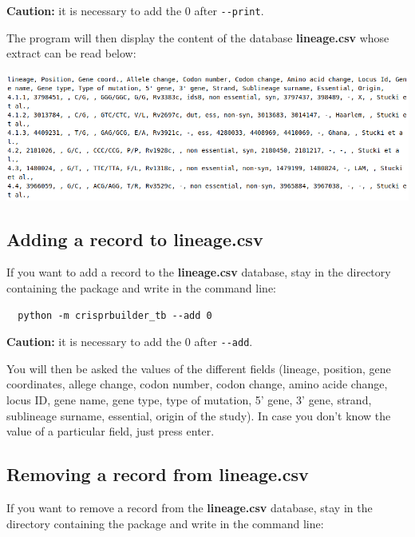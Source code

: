 \documentclass[twoside,a4paper,11pt,frenchb,openany]{report}
\begin{document}
    \textbf{Caution:} it is necessary to add the 0 after \texttt{-\/-print}.

The program will then display the content of the database
\textbf{lineage.csv} whose extract can be read below:

\includegraphics[width=16cm]{img_01.png}



    \subsection*{Adding a record to
lineage.csv}\label{adding-a-record-to-lineage.csv}

    If you want to add a record to the \textbf{lineage.csv} database, stay
in the directory containing the package and write in the command line:

    \begin{verbatim}
  python -m crisprbuilder_tb --add 0
\end{verbatim}

    \textbf{Caution:} it is necessary to add the 0 after \texttt{-\/-add}.

You will then be asked the values of the different fields (lineage,
position, gene coordinates, allege change, codon number, codon change,
amino acide change, locus ID, gene name, gene type, type of mutation, 5'
gene, 3' gene, strand, sublineage surname, essential, origin of the
study). In case you don't know the value of a particular field, just
press enter.



    \subsection*{Removing a record from
lineage.csv}\label{removing-a-record-from-lineage.csv}

    If you want to remove a record from the \textbf{lineage.csv} database,
stay in the directory containing the package and write in the command
line:
\end{document}

